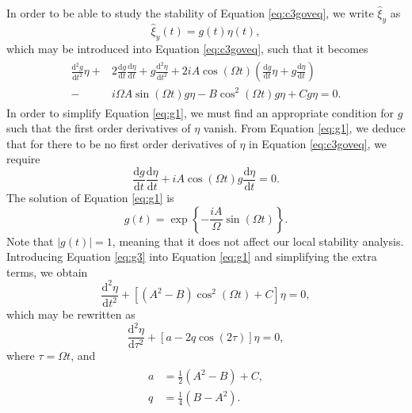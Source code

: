 %
In order to be able to study the stability of Equation \eqref{eq:c3goveq}, we write $\hat \xi_y$ as
%
\begin{equation}
\label{eq:g0}
\hat \xi_y (t) = g(t) \eta(t),
\end{equation}
%
which may be introduced into Equation \eqref{eq:c3goveq}, such that it becomes
%
\begin{align}
\begin{split}
\label{eq:g1}
\frac{\mathrm{d}^2 g}{\mathrm{d} t^2} \eta
+ & 2 \frac{\mathrm{d} g}{\mathrm{d} t} \frac{\mathrm{d} \eta}{\mathrm{d} t}
+ g \frac{\mathrm{d}^2 \eta}{\mathrm{d} t^2}
+ 2 i A \cos(\Omega t) ( \frac{\mathrm{d} g}{\mathrm{d} t} \eta
+ g \frac{\mathrm{d} \eta}{\mathrm{d} t})
\\[0.1cm]
- & i \Omega A \sin(\Omega t) g \eta 
- B \cos^2(\Omega t) g \eta
+ C g \eta
= 0.
\end{split}
\end{align}
%
In order to simplify Equation \eqref{eq:g1}, we must find an appropriate condition for $g$ such that the first order derivatives of $\eta$ vanish.
From Equation \eqref{eq:g1}, we deduce that for there to be no first order derivatives of $\eta$ in Equation \eqref{eq:c3goveq}, we require
%
\begin{equation}
\label{eq:g2}
\frac{\mathrm{d} g}{\mathrm{d} t} \frac{\mathrm{d} \eta}{\mathrm{d} t}
+ i A \cos(\Omega t) g \frac{\mathrm{d} \eta}{\mathrm{d} t}
= 0.
\end{equation}
%
The solution of Equation \eqref{eq:g1} is
%
\begin{equation}
\label{eq:g3}
g(t) = \exp\left\{- \frac{i A}{\Omega} \sin(\Omega t)\right\}.
\end{equation}
Note that $|g(t)| = 1$, meaning that it does not affect our local stability analysis.
%
Introducing Equation \eqref{eq:g3} into Equation \eqref{eq:g1} and simplifying the extra terms, we obtain
\begin{equation}
\frac{\mathrm{d}^2 \eta}{\mathrm{d} t^2} + [(A^2 - B)\cos^2(\Omega t) + C] \eta = 0,
\end{equation}
%
which may be rewritten as
%
\begin{equation}
\label{eq:mathieu}
\frac{\mathrm{d}^2 \eta}{\mathrm{d} \tau^2}
+ [a - 2 q \cos(2 \tau)] \eta = 0,
\end{equation}
%
where $\tau = \Omega t$, and
\begin{align}
\begin{split}
\label{eq:aq0}
a & = \frac{1}{2} (A^2 - B) + C,
\\[0.1cm]
q & = \frac{1}{4} (B - A^2).
\end{split}
\end{align}
%

